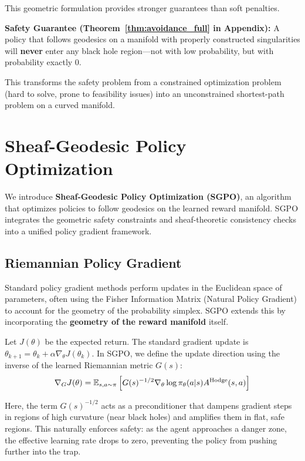 This geometric formulation provides stronger guarantees than soft penalties.

\textbf{Safety Guarantee (Theorem~\ref{thm:avoidance_full} in Appendix):} A policy that follows geodesics on a manifold with properly constructed singularities will \textbf{never} enter any black hole region---not with low probability, but with probability exactly 0.

This transforms the safety problem from a constrained optimization problem (hard to solve, prone to feasibility issues) into an unconstrained shortest-path problem on a curved manifold.

\section{Sheaf-Geodesic Policy Optimization}
\label{sec:sgpo}

We introduce \textbf{Sheaf-Geodesic Policy Optimization (SGPO)}, an algorithm that optimizes policies to follow geodesics on the learned reward manifold. SGPO integrates the geometric safety constraints and sheaf-theoretic consistency checks into a unified policy gradient framework.

\subsection{Riemannian Policy Gradient}

Standard policy gradient methods perform updates in the Euclidean space of parameters, often using the Fisher Information Matrix (Natural Policy Gradient) to account for the geometry of the probability simplex. SGPO extends this by incorporating the \textbf{geometry of the reward manifold} itself.

Let $J(\theta)$ be the expected return. The standard gradient update is $\theta_{k+1} = \theta_k + \alpha \nabla_\theta J(\theta_k)$. In SGPO, we define the update direction using the inverse of the learned Riemannian metric $G(s)$:
\begin{equation}
\nabla_G J(\theta) = \mathbb{E}_{s,a \sim \pi} \left[ G(s)^{-1/2} \nabla_\theta \log \pi_\theta(a|s) A^{\text{Hodge}}(s,a) \right]
\end{equation}

Here, the term $G(s)^{-1/2}$ acts as a preconditioner that dampens gradient steps in regions of high curvature (near black holes) and amplifies them in flat, safe regions. This naturally enforces safety: as the agent approaches a danger zone, the effective learning rate drops to zero, preventing the policy from pushing further into the trap.

